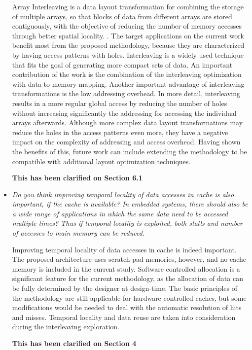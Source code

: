 \documentclass[12pt,a4paper,notitlepage]{article}
\begin{document}
\begin{itemize}
Array Interleaving is a data layout transformation for combining the storage of multiple arrays, so that blocks of data from different arrays are stored contiguously, with the objective of reducing the number of memory accesses through better spatial locality. \cite{sharma2015array}.
The target applications on the current work benefit most from the proposed methodology, because they are characterized by having access patterns with holes.
Interleaving is a widely used technique that fits the goal of generating more compact sets of data.
An important contribution of the work is the combination of the interleaving optimization with data to memory mapping. 
Another important advantage of interleaving transformations is the low addressing  overhead.
In more detail, interleaving results in a more regular global access by reducing the number of holes without increasing significantly the addressing for accessing the individual arrays afterwards.
Although more complex data layout transformations may reduce the holes in the access patterns even more, they have a negative impact on the complexity of addressing and access overhead.
Having shown the benefits of this, future work can include extending the methodology to be compatible with additional layout optimization techniques.

\textbf{This has been clarified on Section 6.1}

\item \textit{Do you think improving temporal locality of data accesses in cache is also important, if the cache is available? In embedded systems, there should also be a wide range of applications in which the same data need to be accessed multiple times? Thus if temporal locality is exploited, both stalls and number of accesses to main memory can be reduced.}

Improving temporal locality of data accesses in cache is indeed important. 
The proposed architecture uses scratch-pad memories, however, and no cache memory is included in the current study.
Software controlled allocation is a significant feature for the current methodology, as the allocation of data can be fully determined by the designer at design-time.
The basic principles of the methodology are still applicable for hardware controlled caches, but some modifications would be needed to deal with the automatic resolution of hits and misses.
Temporal locality and data reuse are taken into consideration during the interleaving exploration.

\textbf{This has been clarified on Section 4}


\end{itemize}
\end{document}
